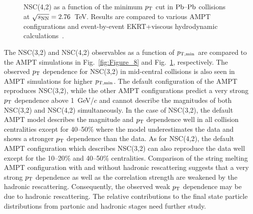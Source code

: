 \begin{figure}[t!]
             \begin{center}
              \end{center}
             \caption{NSC(4,2) as a function of the minimum $p_{\rm T}$ cut in $\textnormal{Pb--Pb}$ collisions at $\sqrt{s_{\textnormal{NN}}}=2.76$~TeV. Results are compared to various AMPT configurations and event-by-event EKRT+viscous hydrodynamic calculations~\cite{Niemi:2015qia}.}
             \label{fig:Figure_9}
\end{figure}

The NSC(3,2) and NSC(4,2) observables as a function of $p_{\rm T, min}$ are compared to the {AMPT} simulations in Fig.~\ref{fig:Figure_8} and Fig.~\ref{fig:Figure_9}, respectively.
The observed $p_{\rm T}$ dependence for NSC(3,2) in mid-central collisions is also seen in AMPT simulations for higher $p_{\rm T, min}$.
The default configuration of the AMPT reproduces NSC(3,2), while the other AMPT configurations predict a very strong $p_{\rm T}$ dependence above 1~GeV/$c$ and cannot describe the magnitudes of both NSC(3,2) and NSC(4,2) simultaneously.
In the case of NSC(3,2), the default AMPT model describes the magnitude and $p_{\rm T}$ dependence well in all collision centralities except for 40--50\% where the model underestimates the data and shows a stronger $p_{\rm T}$ dependence than the data.
As for  NSC(4,2), the default AMPT configuration which describes NSC(3,2) can also reproduce the data well except for the 10--20\% and 40--50\% centralities.
Comparison of the string melting AMPT configuration with and without hadronic rescattering suggests that a very strong $p_{\rm T}$ dependence as well as the correlation strength are weakened by the hadronic rescattering.
Consequently, the observed weak $p_{\rm T}$ dependence may be due to hadronic rescattering. The relative contributions to the final state particle distributions from partonic and hadronic stages need further study.

